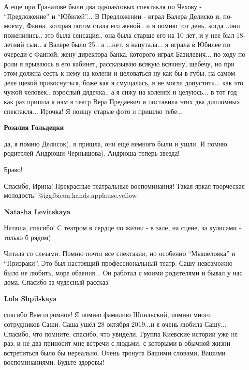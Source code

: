 \begin{itemize}

А еще при Гранатове были два одноактовых спектакля по Чехову - \enquote{Предложение} и
\enquote{Юбилей}... В Предложении - играл Валера Делиско и, по\hyp моему, Фаина, которая
потом стала его женой.. и я помню тот день, когда ..они поженились.. это была
сенсация.. она была старше его на 10 лет, и у нее был 18-летний сын.. а Валере
было 25.. а ...нет, я напутала... я играла в Юбилее по очереди с Фаиной, жену
директора банка, которого играл Базилевич... по ходу по роли я врываюсь в его
кабинет, рассказываю всякую всячину, щебечу, но при этом должна сесть к нему на
колени и целоваться ну как бы в губы, на самом деле щекой прикоснуться, боже
как я смущалась, я не могла допустить... как это чужой человек.. взрослый
дядечка.. а я сижу на коленях и целуюсь... в тот год как раз пришла к нам в театр
Вера Предаевич и поставила этих два дипломных спектакля... Ирочка! Я поищу
старые фото и пришлю тебе...

\textbf{Розалия Гольдецки} 

да, я помню Делисок), я пришла, они ещё немного были и ушли. И помню родителей
Андрюши Чернышова). Андрюша теперь звезда!

Браво!


Спасибо, Ирина! Прекрасные театральные воспоминания! Такая яркая творческая
молодость! @igg{fbicon.hands.applause.yellow} 

\textbf{Natasha Levitskaya} 

Наташа, спасибо! С театром в сердце по жизни - в зале, на сцене, за кулисами - только б рядом)


Читала со слезами. Помню почти все спектакли, но особенно \enquote{Мышеловка} и
\enquote{Призраки}. Это был настоящий профессиональный театр. Сашу невозможно было не
любить, море обаяния... Он работал с моими родителями и бывал у нас дома.
Спасибо за чудесный рассказ!

\begin{itemize} %
\textbf{Lola Shpilskaya} 

спасибо Вам огромное! Я помню фамилию Шпильский, помню много сотрудников Саши.
Саша ушёл 28 октября 2019...и я очень любила Сашу... Спасибо, что помните,
спасибо, что увидели. Группа Киевские истории уже не раз, и не два приносит мне
встречи с людьми, с которыми в обычной жизни встретиться было бы нереально.
Очень тронута Вашими словами, Вашими воспоминаниями. Будьте здоровы!


\end{itemize}
\end{itemize}
